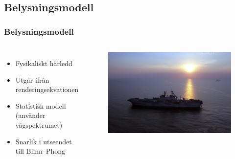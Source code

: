 \subsection{Belysningsmodell}

\begin{frame}
\frametitle{Belysningsmodell}

\begin{columns}[c]


{
\begin{itemize} %
\item Fysikaliskt härledd
\item Utgår ifrån renderingsekvationen
\item Statistisk modell (använder vågspektrumet)
\item Snarlik i utseendet till Blinn--Phong
\end{itemize}
}


{
\begin{figure}
\centering
\includegraphics[width=\textwidth]{../Report/Images/Public_domain/Sunglint_close_to_the_horizon}
\end{figure}
}

\end{columns}

\end{frame}
